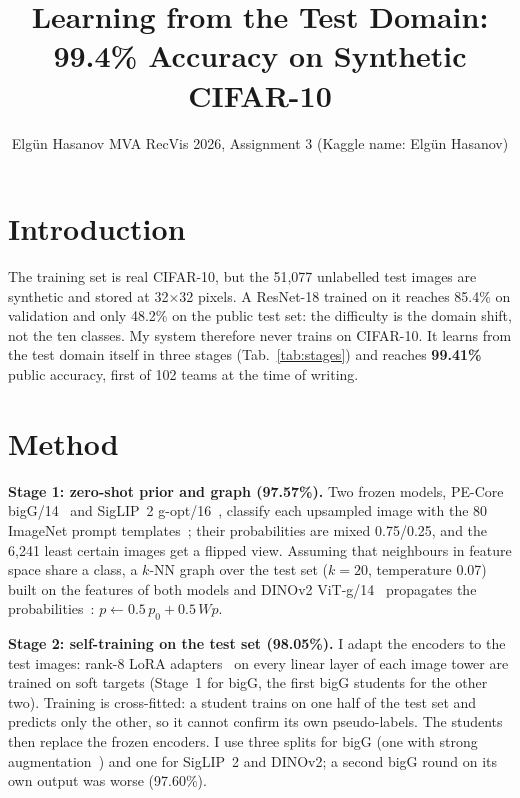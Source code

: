 \documentclass[10pt,twocolumn,letterpaper]{article}
\title{\vspace{-11mm}Learning from the Test Domain: 99.4\% Accuracy on Synthetic CIFAR-10\vspace{-3mm}}
\author{Elg\"un Hasanov \quad\textnormal{\large MVA RecVis 2026, Assignment 3 (Kaggle name: Elg\"un Hasanov)}\vspace{-11mm}}
\newcommand{\sect}[1]{\vspace{-2.2mm}\section{#1}\vspace{-2.4mm}}
\newcommand{\head}[1]{\par\vspace{0.5pt}\noindent\textbf{#1}}
\begin{document}
\maketitle

\sect{Introduction}
The training set is real CIFAR-10, but the 51,077 unlabelled test images are synthetic and stored at 32$\times$32 pixels.
A ResNet-18 trained on it reaches 85.4\% on validation and only 48.2\% on the public test set: the difficulty is the domain shift, not the ten classes.
My system therefore never trains on CIFAR-10.
It learns from the test domain itself in three stages (Tab.~\ref{tab:stages}) and reaches \textbf{99.41\%} public accuracy, first of 102 teams at the time of writing.

\sect{Method}
\noindent\textbf{Stage 1: zero-shot prior and graph (97.57\%).}
Two frozen models, PE-Core bigG/14~\cite{bolya2025pe} and SigLIP~2 g-opt/16~\cite{tschannen2025siglip2}, classify each upsampled image with the 80 ImageNet prompt templates~\cite{radford2021clip}; their probabilities are mixed 0.75/0.25, and the 6,241 least certain images get a flipped view.
Assuming that neighbours in feature space share a class, a $k$-NN graph over the test set ($k{=}20$, temperature 0.07) built on the features of both models and DINOv2 ViT-g/14~\cite{oquab2024dinov2} propagates the probabilities~\cite{zhou2003consistency}: \mbox{$p \leftarrow 0.5\,p_0 + 0.5\,Wp$}.

\head{Stage 2: self-training on the test set (98.05\%).}
I adapt the encoders to the test images: rank-8 LoRA adapters~\cite{hu2022lora} on every linear layer of each image tower are trained on soft targets (Stage~1 for bigG, the first bigG students for the other two).
Training is cross-fitted: a student trains on one half of the test set and predicts only the other, so it cannot confirm its own pseudo-labels.
The students then replace the frozen encoders.
I use three splits for bigG (one with strong augmentation~\cite{xie2020noisystudent}) and one for SigLIP~2 and DINOv2; a second bigG round on its own output was worse (97.60\%).
\end{document}
